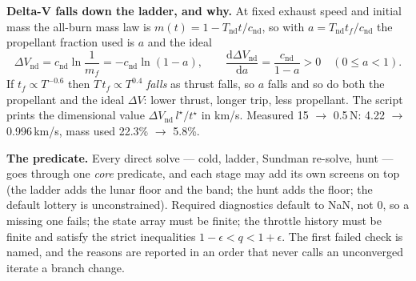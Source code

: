 \documentclass[11pt]{article}
\newcommand{\tf}{t_f}\newcommand{\R}{\mathbb{R}}
\newcommand{\Tnd}{T_{\mathrm{nd}}}\newcommand{\cnd}{c_{\mathrm{nd}}}
\begin{document}
\begin{rig}
\textbf{Delta-V falls down the ladder, and why.} At fixed exhaust speed
and initial mass the all-burn mass law is $m(t)=1-\Tnd t/\cnd$, so with
$a=\Tnd\tf/\cnd$ the propellant fraction used is $a$ and the ideal
\[
\Delta V_{\mathrm{nd}}=\cnd\ln\frac1{m_f}=-\cnd\ln(1-a),\qquad
\frac{\mathrm d\Delta V_{\mathrm{nd}}}{\mathrm da}=\frac{\cnd}{1-a}>0\quad(0\le a<1).
\]
If $\tf\propto T^{-0.6}$ then $T\,\tf\propto T^{0.4}$ \emph{falls} as
thrust falls, so $a$ falls and so do both the propellant and the ideal
$\Delta V$: lower thrust, longer trip, less propellant. The script prints the
dimensional value $\Delta V_{\mathrm{nd}}\,l^\star/t^\star$ in km/s.
Measured 15 $\to$ 0.5\,N: 4.22 $\to$ 0.996\,km/s, mass used 22.3\% $\to$
5.8\%.

\textbf{The predicate.} Every direct solve --- cold, ladder, Sundman
re-solve, hunt --- goes through one \emph{core} predicate, and each stage may
add its own screens on top (the ladder adds the lunar floor and the band;
the hunt adds the floor; the default lottery is unconstrained). Required
diagnostics default to NaN, not 0, so a missing one fails; the state array
must be finite; the throttle history must be finite and satisfy the strict
inequalities $1-\epsilon<q<1+\epsilon$. The first failed check is named, and
the reasons are reported in an order that never calls an unconverged
iterate a branch change.
\end{rig}
\end{document}
